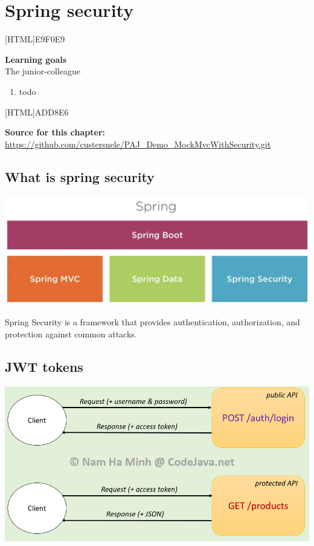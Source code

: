 \chapter{Spring security}

[HTML]{E9F0E9}{\parbox{\textwidth}{%
\noindent \textbf{Learning goals}\\
The junior-colleague
\begin{enumerate}[nolistsep]
\item todo
\end{enumerate}
}}


[HTML]{ADD8E6}{\parbox{\textwidth}{%
\noindent \textbf{Source for this chapter:}\\
\url{https://github.com/custersnele/PAJ_Demo_MockMvcWithSecurity.git}
}}


\section{What is spring security}

\includegraphics[width=\textwidth]{./images/chapter-tx/spring_boot.png}

Spring Security is a framework that provides authentication, authorization, and protection against common attacks.

\section{JWT tokens}

\includegraphics[width=\textwidth]{./images/chapter-tx/JWT_request_response.png}


